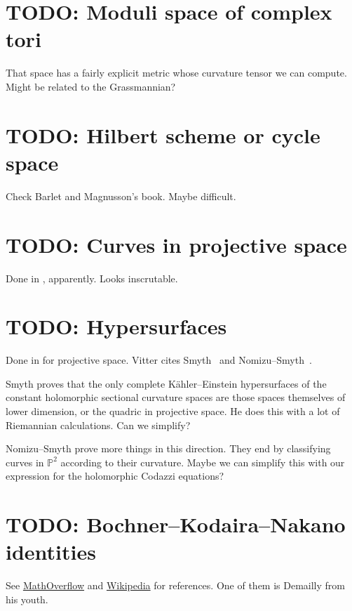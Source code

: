 \documentclass[10pt,a4paper]{article}
\newcommand{\kk}[1]{\mathbb{#1}}
\begin{document}
\section{TODO: Moduli space of complex tori}

That space has a fairly explicit metric whose curvature tensor we can compute. Might be related to the Grassmannian?


\section{TODO: Hilbert scheme or cycle space}

Check Barlet and Magnusson's book. Maybe difficult.

\section{TODO: Curves in projective space}

Done in \cite{fischer1983differential}, apparently. Looks inscrutable.

\section{TODO: Hypersurfaces}

Done in \cite{vitter1974curvature} for projective space. Vitter cites Smyth~\cite{smyth1967differential} and Nomizu--Smyth~\cite{nomizu1968differential}.

Smyth proves that the only complete K\"ahler--Einstein hypersurfaces of the constant holomorphic sectional curvature spaces are those spaces themselves of lower dimension, or the quadric in projective space. He does this with a lot of Riemannian calculations. Can we simplify?

Nomizu--Smyth prove more things in this direction. They end by classifying curves in $\kk P^2$ according to their curvature. Maybe we can simplify this with our expression for the holomorphic Codazzi equations?



\section{TODO: Bochner--Kodaira--Nakano identities}
\label{sec:bochn-koda-nakano}

See
\hyperlink{https://mathoverflow.net/questions/289779/where-do-the-akizuki-nakano-identities-first-appear}{MathOverflow}
and
\hyperlink{https://en.wikipedia.org/wiki/Bochner\%E2\%80\%93Kodaira\%E2\%80\%93Nakano_identity}{Wikipedia}
for references. One of them is Demailly from his youth.
\end{document}
